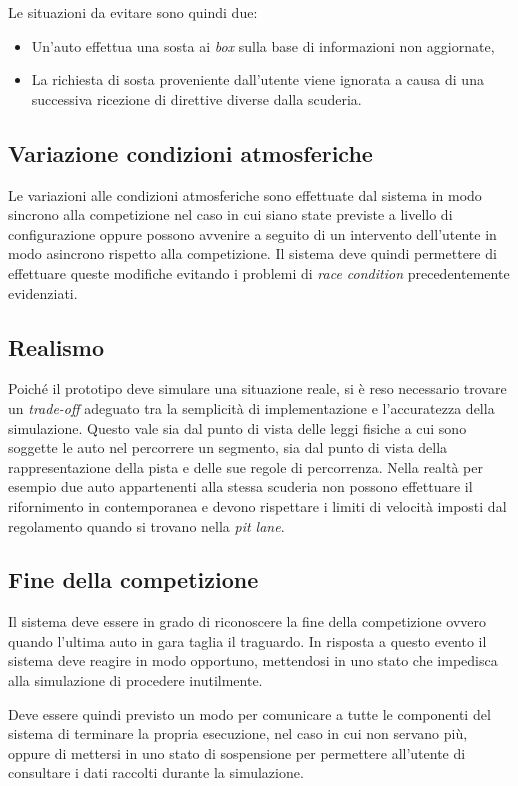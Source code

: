 \documentclass[a4paper]{report}
\begin{document}
Le situazioni da evitare sono quindi due:
\begin{itemize}
\item Un'auto effettua una sosta ai \textit{box} sulla base di informazioni non aggiornate,
\item La richiesta di sosta proveniente dall'utente viene ignorata a causa di una successiva ricezione di direttive diverse dalla scuderia.
\end{itemize}

\subsection*{Variazione condizioni atmosferiche}
Le variazioni alle condizioni atmosferiche sono effettuate dal sistema in modo sincrono alla competizione nel caso in cui siano state previste a livello di configurazione oppure possono avvenire a seguito di un intervento dell'utente in modo asincrono rispetto alla competizione. Il sistema deve quindi permettere di effettuare queste modifiche evitando i problemi di \textit{race condition} precedentemente evidenziati.

\subsection*{Realismo}
Poiché il prototipo deve simulare una situazione reale, si è reso necessario trovare un \textit{trade-off} adeguato tra la semplicità di implementazione e l'accuratezza della simulazione. Questo vale sia dal punto di vista delle leggi fisiche a cui sono soggette le auto nel percorrere un segmento, sia dal punto di vista della rappresentazione della pista e delle sue regole di percorrenza. Nella realtà per esempio due auto appartenenti alla stessa scuderia non possono effettuare il rifornimento in contemporanea e devono rispettare i limiti di velocità imposti dal regolamento quando si trovano nella \textit{pit lane}.

\subsection*{Fine della competizione}
Il sistema deve essere in grado di riconoscere la fine della competizione ovvero quando l'ultima auto in gara taglia il traguardo. In risposta a questo evento il sistema deve reagire in modo opportuno, mettendosi in uno stato che impedisca alla simulazione di procedere inutilmente.

Deve essere quindi previsto un modo per comunicare a tutte le componenti del sistema di terminare la propria esecuzione, nel caso in cui non servano più, oppure di mettersi in uno stato di sospensione per permettere all'utente di consultare i dati raccolti durante la simulazione.
\end{document}
